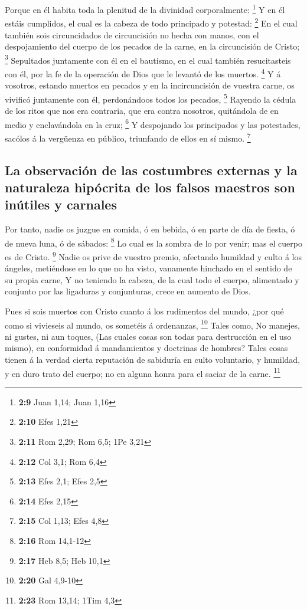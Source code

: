  Porque en él habita toda la plenitud de la divinidad
corporalmente: \footnote{\textbf{2:9} Juan 1,14; Juan 1,16}
 Y en él estáis cumplidos, el cual es la cabeza de todo
principado y potestad: \footnote{\textbf{2:10} Efes 1,21}
 En el cual también sois circuncidados de circuncisión no
hecha con manos, con el despojamiento del cuerpo de los pecados de la
carne, en la circuncisión de Cristo; \footnote{\textbf{2:11} Rom 2,29;
  Rom 6,5; 1Pe 3,21}  Sepultados juntamente con él en el
bautismo, en el cual también resucitasteis con él, por la fe de la
operación de Dios que le levantó de los muertos. \footnote{\textbf{2:12}
  Col 3,1; Rom 6,4}  Y á vosotros, estando muertos en
pecados y en la incircuncisión de vuestra carne, os vivificó juntamente
con él, perdonándoos todos los pecados, \footnote{\textbf{2:13} Efes
  2,1; Efes 2,5}  Rayendo la cédula de los ritos que nos
era contraria, que era contra nosotros, quitándola de en medio y
enclavándola en la cruz; \footnote{\textbf{2:14} Efes 2,15}
 Y despojando los principados y las potestades, sacólos á
la vergüenza en público, triunfando de ellos en sí mismo. \footnote{\textbf{2:15}
  Col 1,13; Efes 4,8}

\hypertarget{la-observaciuxf3n-de-las-costumbres-externas-y-la-naturaleza-hipuxf3crita-de-los-falsos-maestros-son-inuxfatiles-y-carnales}{%
\subsection{La observación de las costumbres externas y la naturaleza
hipócrita de los falsos maestros son inútiles y
carnales}\label{la-observaciuxf3n-de-las-costumbres-externas-y-la-naturaleza-hipuxf3crita-de-los-falsos-maestros-son-inuxfatiles-y-carnales}}

 Por tanto, nadie os juzgue en comida, ó en bebida, ó en
parte de día de fiesta, ó de nueva luna, ó de sábados: \footnote{\textbf{2:16}
  Rom 14,1-12}  Lo cual es la sombra de lo por venir; mas
el cuerpo es de Cristo. \footnote{\textbf{2:17} Heb 8,5; Heb 10,1}
 Nadie os prive de vuestro premio, afectando humildad y
culto á los ángeles, metiéndose en lo que no ha visto, vanamente
hinchado en el sentido de su propia carne,  Y no teniendo
la cabeza, de la cual todo el cuerpo, alimentado y conjunto por las
ligaduras y conjunturas, crece en aumento de Dios.

 Pues si sois muertos con Cristo cuanto á los rudimentos
del mundo, ¿por qué como si vivieseis al mundo, os sometéis á
ordenanzas, \footnote{\textbf{2:20} Gal 4,9-10}  Tales
como, No manejes, ni gustes, ni aun toques,  (Las cuales
cosas son todas para destrucción en el uso mismo), en conformidad á
mandamientos y doctrinas de hombres?  Tales cosas tienen
á la verdad cierta reputación de sabiduría en culto voluntario, y
humildad, y en duro trato del cuerpo; no en alguna honra para el saciar
de la carne. \footnote{\textbf{2:23} Rom 13,14; 1Tim 4,3}

